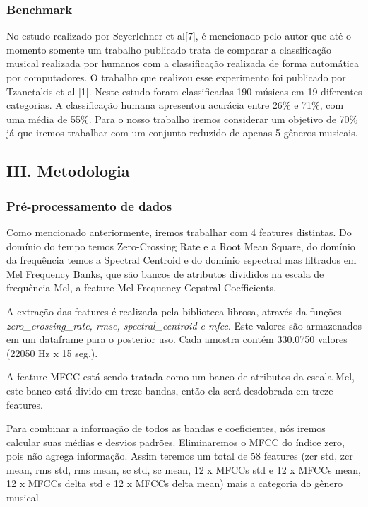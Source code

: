 \documentclass[11pt]{article}
\begin{document}
    \subsubsection{Benchmark}\label{benchmark}

No estudo realizado por Seyerlehner et al{[}7{]}, é mencionado pelo
autor que até o momento somente um trabalho publicado trata de comparar
a classificação musical realizada por humanos com a classificação
realizada de forma automática por computadores. O trabalho que realizou
esse experimento foi publicado por Tzanetakis et al {[}1{]}. Neste
estudo foram classificadas 190 músicas em 19 diferentes categorias. A
classificação humana apresentou acurácia entre 26\% e 71\%, com uma
média de 55\%. Para o nosso trabalho iremos considerar um objetivo de
70\% já que iremos trabalhar com um conjunto reduzido de apenas 5
gêneros musicais.

\subsection{III. Metodologia}\label{iii.-metodologia}

\subsubsection{Pré-processamento de
dados}\label{pruxe9-processamento-de-dados}

Como mencionado anteriormente, iremos trabalhar com 4 features
distintas. Do domínio do tempo temos Zero-Crossing Rate e a Root Mean
Square, do domínio da frequência temos a Spectral Centroid e do domínio
espectral mas filtrados em Mel Frequency Banks, que são bancos de
atributos divididos na escala de frequência Mel, a feature Mel Frequency
Cepstral Coefficients.

A extração das features é realizada pela biblioteca librosa, através da
funções \emph{zero\_crossing\_rate, rmse, spectral\_centroid e mfcc}.
Este valores são armazenados em um dataframe para o posterior uso. Cada
amostra contém 330.0750 valores (22050 Hz x 15 seg.).

A feature MFCC está sendo tratada como um banco de atributos da escala
Mel, este banco está divido em treze bandas, então ela será desdobrada
em treze features.

Para combinar a informação de todos as bandas e coeficientes, nós iremos
calcular suas médias e desvios padrões. Eliminaremos o MFCC do índice
zero, pois não agrega informação. Assim teremos um total de 58 features
(zcr std, zcr mean, rms std, rms mean, sc std, sc mean, 12 x MFCCs std e
12 x MFCCs mean, 12 x MFCCs delta std e 12 x MFCCs delta mean) mais a
categoria do gênero musical.
\end{document}
